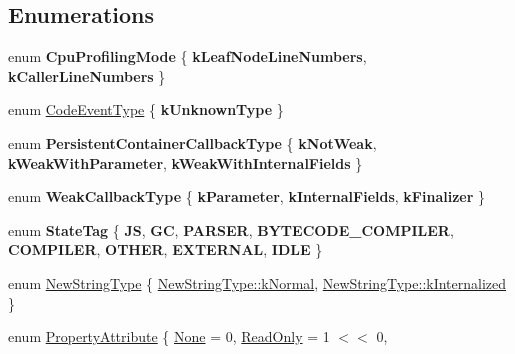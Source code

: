 \subsection*{Enumerations}
\begin{DoxyCompactItemize}
\item 
\mbox{\label{namespacev8_a57a16107c54510306c4e53f8cc5e9848}} 
enum {\bfseries Cpu\+Profiling\+Mode} \{ {\bfseries k\+Leaf\+Node\+Line\+Numbers}, 
{\bfseries k\+Caller\+Line\+Numbers}
 \}
\item 
enum \mbox{\hyperlink{namespacev8_af0ff31131cc32ced9b5279b321569bbc}{Code\+Event\+Type}} \{ {\bfseries k\+Unknown\+Type}
 \}
\item 
\mbox{\label{namespacev8_ad2a33b8f8a1701a800a691dd025f7dde}} 
enum {\bfseries Persistent\+Container\+Callback\+Type} \{ {\bfseries k\+Not\+Weak}, 
{\bfseries k\+Weak\+With\+Parameter}, 
{\bfseries k\+Weak\+With\+Internal\+Fields}
 \}
\item 
\mbox{\label{namespacev8_a68b2b90003e18980bc0b438c95be1005}} 
enum {\bfseries Weak\+Callback\+Type} \{ {\bfseries k\+Parameter}, 
{\bfseries k\+Internal\+Fields}, 
{\bfseries k\+Finalizer}
 \}
\item 
\mbox{\label{namespacev8_adb1bd0f9ef7cc084b6a94a5e1b420f69}} 
enum {\bfseries State\+Tag} \{ \newline
{\bfseries JS}, 
{\bfseries GC}, 
{\bfseries P\+A\+R\+S\+ER}, 
{\bfseries B\+Y\+T\+E\+C\+O\+D\+E\+\_\+\+C\+O\+M\+P\+I\+L\+ER}, 
\newline
{\bfseries C\+O\+M\+P\+I\+L\+ER}, 
{\bfseries O\+T\+H\+ER}, 
{\bfseries E\+X\+T\+E\+R\+N\+AL}, 
{\bfseries I\+D\+LE}
 \}
\item 
enum \mbox{\hyperlink{namespacev8_ac9163ab12fb3b2a95907a3a0367c6095}{New\+String\+Type}} \{ \mbox{\hyperlink{namespacev8_ac9163ab12fb3b2a95907a3a0367c6095a07fa7a19aa722c635a15e94cb7f50416}{New\+String\+Type\+::k\+Normal}}, 
\mbox{\hyperlink{namespacev8_ac9163ab12fb3b2a95907a3a0367c6095ade6a7f11cd845d59e52b388d18929295}{New\+String\+Type\+::k\+Internalized}}
 \}
\item 
enum \mbox{\hyperlink{namespacev8_a05f25f935e108a1ea2d150e274602b87}{Property\+Attribute}} \{ \mbox{\hyperlink{namespacev8_a05f25f935e108a1ea2d150e274602b87a7ab4d58719c33b3ea2dfaefa29b111df}{None}} = 0, 
\mbox{\hyperlink{namespacev8_a05f25f935e108a1ea2d150e274602b87ae573d0077ef51499dfd8cb937c1fb9c3}{Read\+Only}} = 1 $<$$<$ 0, 
$$
\end{DoxyCompactItemize}
